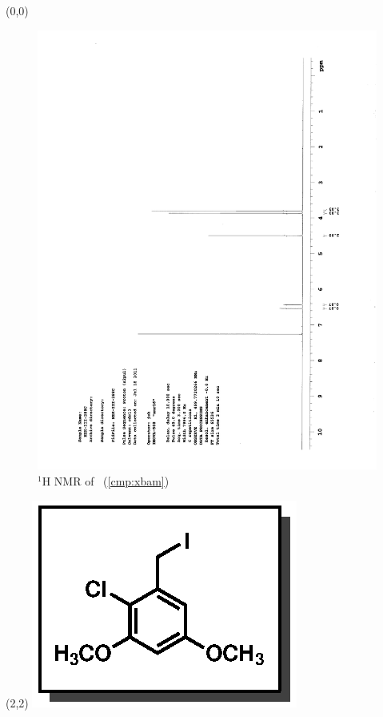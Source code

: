 \begin{textblock}{20}(0,0)
\begin{figure}[htb]
\caption{$^1$H NMR of \CMPxbam\ (\ref{cmp:xbam})}
\includegraphics[scale=0.75, trim = 0mm 0mm 0mm 5mm,
clip]{chp_singlecarbon/images/nmr/xbamH}
\vspace{-100pt}
\end{figure}
\end{textblock}
\begin{textblock}{1}(2,2)
\includegraphics[scale=0.8, angle=90]{chp_singlecarbon/images/xbam}
\end{textblock}
